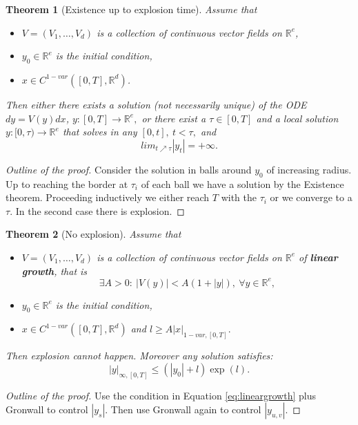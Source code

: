 \documentclass{article}
\newcommand{\R}{\mathbb{R}}
\newtheorem{theorem}{Theorem}
\begin{document}
\begin{theorem}[Existence up to explosion time]
      Assume that
    \begin{itemize}
        \item $V = (V_1, \ldots, V_d)$ is a collection of continuous vector fields on $\R^e$,
        \item $y_0 \in \R^e$ is the initial condition,
        \item $x \in C^{1-var}([0,T], \R^d)$.
    \end{itemize}
    Then either there exists a solution (not necessarily unique) of the ODE $dy = V(y)dx$, $y:[0,T] \rightarrow \R^e,$
    or there exist a $\tau \in [0,T]$ and a local solution $y:[0,\tau) \rightarrow \R^e$ that solves in any $[0,t], \ t < \tau,$ and 
 \begin{equation}
    lim_{t \nearrow \tau} |y_t| = +\infty.
 \end{equation}
\end{theorem}
\begin{proof}[Outline of the proof]
    Consider the solution in balls around $y_0$ of increasing radius. Up to reaching the border at $\tau_i$ of each ball we have a solution by the Existence theorem.
    Proceeding inductively we either reach $T$ with the $\tau_i$ or we converge to a $\tau.$ In the second case there is explosion.
\end{proof}

\begin{theorem}[No explosion]
 Assume that
    \begin{itemize}
        \item $V = (V_1, \ldots, V_d)$ is a collection of continuous vector fields on $\R^e$ of \textbf{linear growth}, that is
        \begin{equation}\label{eq:lineargrowth}
             \exists A > 0:\ |V(y)| < A (1 + |y|),\ \forall y \in \R^e,
        \end{equation}
        \item $y_0 \in \R^e$ is the initial condition,
        \item $x \in C^{1-var}([0,T], \R^d)$ and $l \geq A |x|_{1-var,[0,T]}.$
    \end{itemize}   
    Then explosion cannot happen. Moreover any solution satisfies:
    \begin{equation}
        |y|_{\infty, [0,T]} \leq (|y_0| + l) \exp(l).
    \end{equation}
\end{theorem}
\begin{proof}[Outline of the proof]
    Use the condition in Equation \eqref{eq:lineargrowth} plus Gronwall to control $|y_s|.$
    Then use Gronwall again to control $|y_{u,v}|.$
\end{proof}
\end{document}
